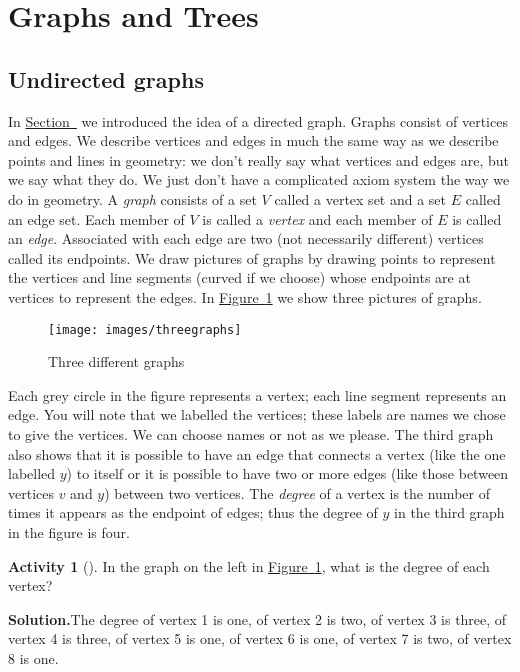 \documentclass[10pt,]{book}
\theoremstyle{plain}
\theoremstyle{definition}
\newtheorem{activity}[project]{Activity}
\numberwithin{equation}{chapter}
\begin{document}
\section[{Graphs and Trees}]{Graphs and Trees}\label{sec_induction-graphstrees}
\typeout{************************************************}
\typeout{************************************************}
\subsection[{Undirected graphs}]{Undirected graphs}\label{graphsection}
In \hyperref[Ramseysection]{Section~} we introduced the idea of a directed graph. Graphs consist of vertices and edges. We describe vertices and edges in much the same way as we describe points and lines in geometry: we don't really say what vertices and edges are, but we say what they do. We just don't have a complicated axiom system the way we do in geometry. A \emph{graph} consists of a set \(V\) called a vertex set and a set \(E\) called an edge set. Each member of \(V\) is called a \emph{vertex} and each member of \(E\) is called an \emph{edge}. Associated with each edge are two (not necessarily different) vertices called its endpoints. We draw pictures of graphs by drawing points to represent the vertices and line segments (curved if we choose) whose endpoints are at vertices to represent the edges. In \hyperref[Threegraphs]{Figure~\ref{Threegraphs}} we show three pictures of graphs.%
\begin{figure}
\centering
\texttt{[image: images/threegraphs]}
\caption{Three different graphs\label{Threegraphs}}
\end{figure}
Each grey circle in the figure represents a vertex; each line segment represents an edge. You will note that we labelled the vertices; these labels are names we chose to give the vertices. We can choose names or not as we please. The third graph also shows that it is possible to have an edge that connects a vertex (like the one labelled \(y\)) to itself or it is possible to have two or more edges (like those between vertices \(v\) and \(y\)) between two vertices. The \emph{degree} of a vertex is the number of times it appears as the endpoint of edges; thus the degree of \(y\) in the third graph in the figure is four.%
\begin{activity}[]\label{activity-92}
In the graph on the left in \hyperref[Threegraphs]{Figure~\ref{Threegraphs}}, what is the degree of each vertex?%
\par\medskip\noindent%
\textbf{Solution.}\quad The degree of vertex 1 is one, of vertex 2 is two, of vertex 3 is three, of vertex 4 is three, of vertex 5 is one, of vertex 6 is one, of vertex 7 is two, of vertex 8 is one.%
\end{activity}
\end{document}

